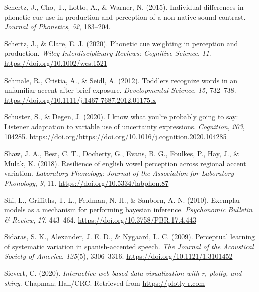 \documentclass[
  11pt,
  english,
  man,floatsintext]{apa6}
\newlength{\cslhangindent}
\newlength{\cslentryspacingunit} %
\newenvironment{CSLReferences}[2] %
 {%
  \setlength{\parindent}{0pt}
  \ifodd #1
  \let\oldpar\par
  \def\par{\hangindent=\cslhangindent\oldpar}
  \fi
  \setlength{\parskip}{#2\cslentryspacingunit}
 }%
 {}
\begin{document}
\begin{CSLReferences}{1}{0}
\leavevmode{}%
Schertz, J., Cho, T., Lotto, A., \& Warner, N. (2015). Individual differences in phonetic cue use in production and perception of a non-native sound contrast. \emph{Journal of Phonetics}, \emph{52}, 183--204.

\leavevmode{}%
Schertz, J., \& Clare, E. J. (2020). Phonetic cue weighting in perception and production. \emph{Wiley Interdisciplinary Reviews: Cognitive Science}, \emph{11}. \url{https://doi.org/10.1002/wcs.1521}

\leavevmode{}%
Schmale, R., Cristia, A., \& Seidl, A. (2012). Toddlers recognize words in an unfamiliar accent after brief exposure. \emph{Developmental Science}, \emph{15}, 732--738. \url{https://doi.org/10.1111/j.1467-7687.2012.01175.x}

\leavevmode{}%
Schuster, S., \& Degen, J. (2020). I know what you're probably going to say: Listener adaptation to variable use of uncertainty expressions. \emph{Cognition}, \emph{203}, 104285. https://doi.org/\url{https://doi.org/10.1016/j.cognition.2020.104285}

\leavevmode{}%
Shaw, J. A., Best, C. T., Docherty, G., Evans, B. G., Foulkes, P., Hay, J., \& Mulak, K. (2018). Resilience of english vowel perception across regional accent variation. \emph{Laboratory Phonology: Journal of the Association for Laboratory Phonology}, \emph{9}, 11. \url{https://doi.org/10.5334/labphon.87}

\leavevmode{}%
Shi, L., Griffiths, T. L., Feldman, N. H., \& Sanborn, A. N. (2010). Exemplar models as a mechanism for performing bayesian inference. \emph{Psychonomic Bulletin \& Review}, \emph{17}, 443--464. \url{https://doi.org/10.3758/PBR.17.4.443}

\leavevmode{}%
Sidaras, S. K., Alexander, J. E. D., \& Nygaard, L. C. (2009). Perceptual learning of systematic variation in spanish-accented speech. \emph{The Journal of the Acoustical Society of America}, \emph{125}(5), 3306--3316. \url{https://doi.org/10.1121/1.3101452}

\leavevmode{}%
Sievert, C. (2020). \emph{Interactive web-based data visualization with r, plotly, and shiny}. Chapman; Hall/CRC. Retrieved from \url{https://plotly-r.com}


\end{CSLReferences}
\end{document}
